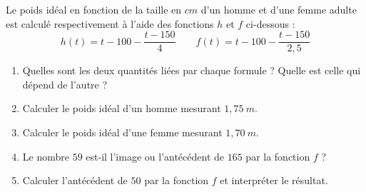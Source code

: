 \documentclass[10pt,openright,twoside,french]{book}
\begin{document}
Le poids idéal en fonction de la taille en $cm$ d'un homme et d'une femme adulte est calculé respectivement à l'aide des fonctions $h$ et $f$ ci-dessous :
\[h(t) = t - 100 - \dfrac{t - 150}{4} \qquad f(t) =  t - 100 - \dfrac{t - 150}{2,5}\]
\begin{enumerate}
    \item Quelles sont les deux quantités liées par chaque formule ? Quelle est celle qui dépend de l'autre ?
    \item Calculer le poids idéal d'un homme mesurant $1,75~m$.
    \item Calculer le poids idéal d'une femme mesurant $1,70~m$.
    \item Le nombre $59$ est-il l'image ou l'antécédent de $165$ par la fonction $f$ ?
    \item Calculer l'antécédent de $50$ par la fonction $f$ et interpréter le résultat.
\end{enumerate}
\end{document}
